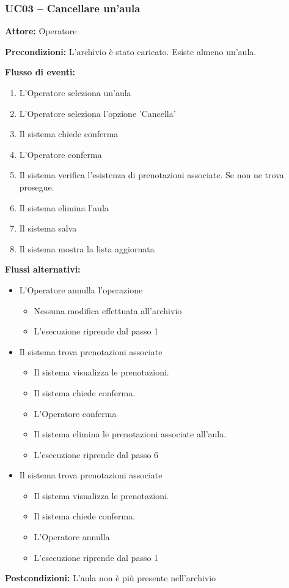 \documentclass[a4paper,11pt]{article}
\begin{document}
\begin{samepage}
\subsubsection*{UC03 -- Cancellare un'aula}
\begin{ucbox}

\noindent\textbf{Attore:} Operatore\par
\noindent\textbf{Precondizioni:} L'archivio è stato caricato. Esiste almeno un'aula.\par

\noindent\textbf{Flusso di eventi:}
\begin{enumerate}
\item L'Operatore seleziona un'aula \item L'Operatore seleziona l'opzione 'Cancella' \item Il sistema chiede conferma \item L'Operatore conferma \item Il sistema verifica l'esistenza di prenotazioni associate. Se non ne trova prosegue. \item Il sistema elimina l'aula \item Il sistema salva \item Il sistema mostra la lista aggiornata \end{enumerate}
\noindent\textbf{Flussi alternativi:}
\begin{itemize}
\item[4a.] L'Operatore annulla l'operazione
\begin{itemize}
\item Nessuna modifica effettuata all'archivio
\item L'esecuzione riprende dal passo 1
\end{itemize}
\item[5a.] Il sistema trova prenotazioni associate
\begin{itemize}
\item Il sistema visualizza le prenotazioni.
\item Il sistema chiede conferma.
\item L'Operatore conferma
\item Il sistema elimina le prenotazioni associate all'aula.
\item L'esecuzione riprende dal passo 6
\end{itemize}
\item[5b.] Il sistema trova prenotazioni associate
\begin{itemize}
\item Il sistema visualizza le prenotazioni.
\item Il sistema chiede conferma.
\item L'Operatore annulla
\item L'esecuzione riprende dal passo 1
\end{itemize}
\end{itemize}
\noindent\textbf{Postcondizioni:} L'aula non è più presente nell'archivio\par
\end{ucbox}
\end{samepage}
\end{document}
